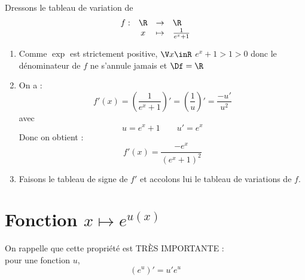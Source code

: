 \documentclass[12pt,fleqn]{report} %
\begin{document}
\begin{example}\text{ }\\
	Dressons le tableau de variation de \[
	\begin{array}{rccl}
	f : & \R & \to & \R \\
	& x& \mapsto & \frac{1}{e^x + 1}
	\end{array}
	\]
	\begin{enumerate}
		\item Comme $\exp$ est strictement positive, $\V x \inR$ $e^x + 1 > 1 > 0$ donc le dénominateur de $f$ ne s'annule jamais et $\Df = \R$
		\item On a : \[
		f'(x) = \left( \frac{1}{e^x + 1} \right)' = \left(\frac{1}{u}\right)' = \frac{-u'}{u^2}
		\]
		avec \[
		u = e^x + 1 \qquad u' = e^x
		\]
		Donc on obtient :\[
		f'(x) = \frac{- e^x}{\left(e^x + 1\right)^2}
		\]
		\item Faisons le tableau de signe de $f'$ et accolons lui le tableau de variations de $f$.
		\begin{center}
		\end{center}		
	\end{enumerate}
\end{example}

\section{Fonction $x \mapsto e^{u(x)}$}
\begin{remark}
	On rappelle que cette propriété est TR\`ES IMPORTANTE : \\ pour une fonction $u$, \[
	\left(e^u\right)' = u' e^u
	\]
\end{remark}
\end{document}
